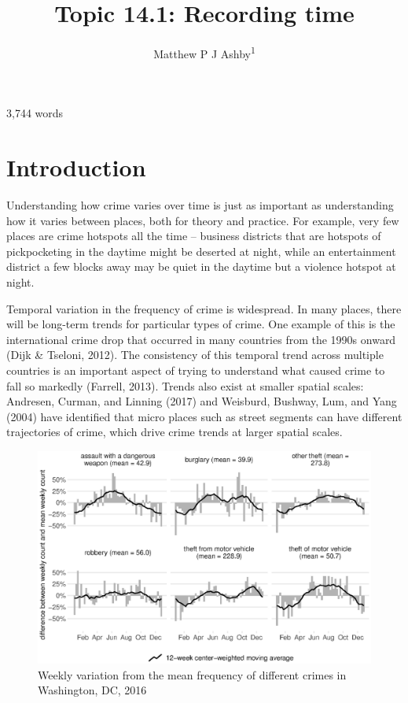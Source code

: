 \documentclass[
  english,
  man,a4paper,mask,floatsintext]{apa6}
\author{Matthew P J Ashby\textsuperscript{1}}
\affiliation{
\vspace{0.5cm}
\textsuperscript{1} Jill Dando Institute of Security and Crime Science, University College London}
\title{Topic 14.1: Recording time}
\date{}
\begin{document}
\maketitle

\singlespacing
\raggedbottom

3,744 words

\hypertarget{introduction}{%
\section{Introduction}\label{introduction}}

Understanding how crime varies over time is just as important as understanding how it varies between places, both for theory and practice. For example, very few places are crime hotspots all the time -- business districts that are hotspots of pickpocketing in the daytime might be deserted at night, while an entertainment district a few blocks away may be quiet in the daytime but a violence hotspot at night.

Temporal variation in the frequency of crime is widespread. In many places, there will be long-term trends for particular types of crime. One example of this is the international crime drop that occurred in many countries from the 1990s onward (Dijk \& Tseloni, 2012). The consistency of this temporal trend across multiple countries is an important aspect of trying to understand what caused crime to fall so markedly (Farrell, 2013). Trends also exist at smaller spatial scales: Andresen, Curman, and Linning (2017) and Weisburd, Bushway, Lum, and Yang (2004) have identified that micro places such as street segments can have different trajectories of crime, which drive crime trends at larger spatial scales.

\begin{figure}
\centering
\includegraphics{figure_14-1.eps}
\caption{\label{fig:seasonal}Weekly variation from the mean frequency of different crimes in Washington, DC, 2016}
\end{figure}
\end{document}
